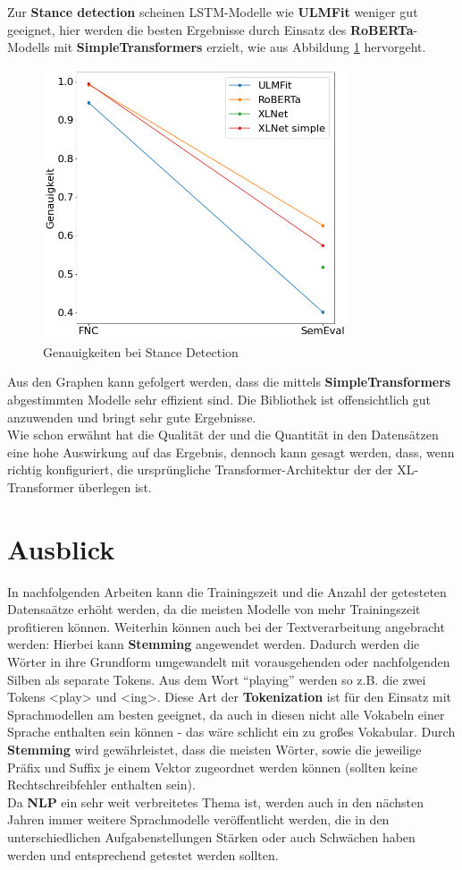 Zur \textbf{Stance detection} scheinen LSTM-Modelle wie \textbf{ULMFit} weniger gut geeignet, hier werden die besten Ergebnisse durch Einsatz des \textbf{RoBERTa}-Modells mit \textbf{SimpleTransformers} erzielt, wie aus Abbildung \ref{fig:acc_stance} hervorgeht.
\begin{figure}[!ht]
\centering
\includegraphics[height=8cm]{pics/accuracies_stance.png}
\caption{Genauigkeiten bei Stance Detection}
\label{fig:acc_stance}
\end{figure}
Aus den Graphen kann gefolgert werden, dass die mittels \textbf{SimpleTransformers} abgestimmten Modelle sehr effizient sind. Die Bibliothek ist offensichtlich gut anzuwenden und bringt sehr gute Ergebnisse. \\
Wie schon erw\"ahnt hat die Qualit\"at der und die Quantit\"at in den Datens\"atzen eine hohe Auswirkung auf das Ergebnis, dennoch kann gesagt werden, dass, wenn richtig konfiguriert, die urspr\"ungliche Transformer-Architektur der der XL-Transformer \"uberlegen ist.

\section{Ausblick}
In nachfolgenden Arbeiten kann die Trainingszeit und die Anzahl der getesteten Datensa\"atze erh\"oht werden, da die meisten Modelle von mehr Trainingszeit profitieren k\"onnen. Weiterhin k\"onnen auch bei der Textverarbeitung angebracht werden: Hierbei kann \textbf{Stemming} angewendet werden. Dadurch werden die W\"orter in ihre Grundform umgewandelt mit vorausgehenden oder nachfolgenden Silben als separate Tokens. Aus dem Wort "`playing"' werden so z.B. die zwei Tokens <play> und <ing>. Diese Art der \textbf{Tokenization} ist f\"ur den Einsatz mit Sprachmodellen am besten geeignet, da auch in diesen nicht alle Vokabeln einer Sprache enthalten sein k\"onnen - das w\"are schlicht ein zu gro{\ss}es Vokabular. Durch \textbf{Stemming} wird gew\"ahrleistet, dass die meisten W\"orter, sowie die jeweilige Pr\"afix und Suffix je einem Vektor zugeordnet werden k\"onnen (sollten keine Rechtschreibfehler enthalten sein).\\
Da \textbf{NLP} ein sehr weit verbreitetes Thema ist, werden auch in den n\"achsten Jahren immer weitere Sprachmodelle ver\"offentlicht werden, die in den unterschiedlichen Aufgabenstellungen St\"arken oder auch Schw\"achen haben werden und entsprechend getestet werden sollten.
